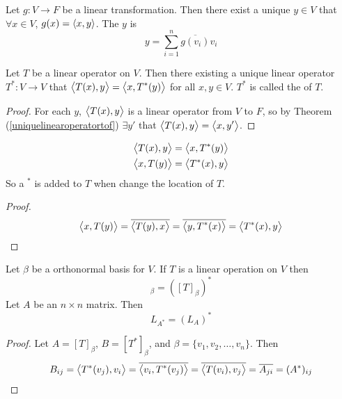 \begin{theorem}\label{uniquelinearoperatortof}
    Let $g: V \rightarrow F$ be a linear transformation. Then there exist a unique $y \in V$ that $\forall x \in V$, $g(x) = \left\langle \displaystyle x, y \right\rangle$. The $y$ is 
    \begin{equation}
        y = \sum_{i=1}^n \overline{g(v_i)} v_i
    \end{equation}
\end{theorem}

\begin{theorem}
    Let $T$ be a linear operator on $V$. Then there existing a unique linear operator $T^* : V \rightarrow V$ that $\left\langle \displaystyle T(x), y \right\rangle=\left\langle \displaystyle x, T^*(y) \right\rangle$ for all $x,y \in V$. $T^*$ is called the  of $T$.
\end{theorem}
\begin{proof}
    For each $y$, $\left\langle \displaystyle T(x), y \right\rangle$ is a linear operator from $V$ to $F$, so by Theorem (\ref{uniquelinearoperatortof}) $\exists y'$ that $\left\langle \displaystyle T(x), y \right\rangle = \left\langle \displaystyle x, y' \right\rangle$.
\end{proof}

\begin{theorem}
    \begin{equation}
        \begin{aligned}
            \left\langle \displaystyle T(x), y \right\rangle &= \left\langle \displaystyle x, T^*(y) \right\rangle \\
            \left\langle \displaystyle x, T(y) \right\rangle &= \left\langle \displaystyle T^*(x), y \right\rangle
        \end{aligned}        
    \end{equation}
    So a $^*$ is added to $T$ when change the location of $T$.
\end{theorem}
\begin{proof}
    \begin{equation*}
        \left\langle \displaystyle x, T(y) \right\rangle = \overline{\left\langle \displaystyle T(y), x \right\rangle} = \overline{\left\langle \displaystyle y, T^*(x) \right\rangle} = \left\langle \displaystyle T^*(x), y \right\rangle
    \end{equation*}
\end{proof}

\begin{theorem}
    Let $\beta$ be a orthonormal basis for $V$. If $T$ is a linear operation on $V$ then
    \begin{equation}
        [T^*]_\beta = ([T]_\beta)^*
    \end{equation}
    Let $A$ be an $n \times n$ matrix. Then
    \begin{equation}
        L_{A^*} = (L_A)^*
    \end{equation}
\end{theorem}
\begin{proof}
    Let $A=[T]_\beta$, $B=[T^*]_\beta$, and $\beta=\{v_1, v_2, \dots, v_n \}$. Then
    \begin{equation*}
        B_{ij} = \left\langle \displaystyle T^*(v_j), v_i \right\rangle = \overline{\left\langle \displaystyle v_i, T^*(v_j) \right\rangle} = \overline{\left\langle \displaystyle T(v_i), v_j \right\rangle} = \overline{A_{ji}} = (A^*)_{ij}
    \end{equation*}
\end{proof}

